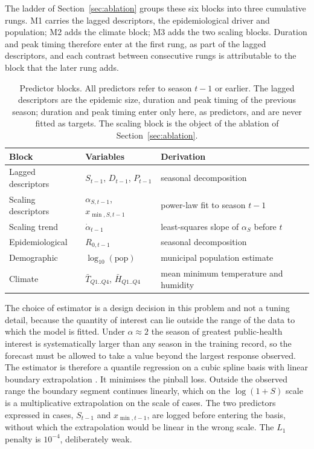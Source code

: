 \documentclass[english,10pt,b5paper]{article}
\begin{document}
The ladder of Section~\ref{sec:ablation} groups these six blocks into three
cumulative rungs. M1 carries the lagged descriptors, the epidemiological driver and
population; M2 adds the climate block; M3 adds the two scaling blocks. Duration and
peak timing therefore enter at the first rung, as part of the lagged descriptors,
and each contrast between consecutive rungs is attributable to the block that the
later rung adds.

\begin{table}[htbp]
\centering
\small
\setlength{\tabcolsep}{4pt}
\caption{Predictor blocks. All predictors refer to season $t-1$ or earlier. The
lagged descriptors are the epidemic size, duration and peak timing of the
previous season; duration and peak timing enter only here, as predictors, and
are never fitted as targets. The scaling block is the object of the ablation of
Section~\ref{sec:ablation}.}
\label{tab:features}
\begin{tabular}{@{}lll@{}}
\toprule
Block & Variables & Derivation\\
\midrule
Lagged descriptors  & $S_{t-1}$, $D_{t-1}$, $P_{t-1}$      & seasonal decomposition\\
Scaling descriptors & $\alpha_{S,t-1}$, $x_{\min,S,t-1}$    & power-law fit to season $t-1$\\
Scaling trend       & $\dot\alpha_{t-1}$                    & least-squares slope of $\alpha_S$ before $t$\\
Epidemiological     & $R_{0,t-1}$                           & seasonal decomposition\\
Demographic         & $\log_{10}(\text{pop})$               & municipal population estimate\\
Climate             & $\bar T_{Q1..Q4}$, $\bar H_{Q1..Q4}$  & mean minimum temperature and humidity\\
\bottomrule
\end{tabular}
\end{table}

The choice of estimator is a design decision in this problem and not a tuning
detail, because the quantity of interest can lie outside the range of the data to
which the model is fitted. Under $\alpha \approx 2$ the season of greatest
public-health interest is systematically larger than any season in the training
record, so the forecast must be allowed to take a value beyond the largest
response observed. The estimator is therefore a quantile regression on a
cubic spline basis with linear boundary extrapolation
\citep{koenker1978regression}. It minimises the pinball loss. Outside the
observed range the boundary segment continues linearly, which on the
$\log(1+S)$ scale is a multiplicative extrapolation on the scale of cases. The two
predictors expressed in cases, $S_{t-1}$ and $x_{\min,t-1}$, are logged before
entering the basis, without which the extrapolation would be linear in the wrong
scale. The $L_1$ penalty is $10^{-4}$, deliberately weak.
\end{document}
